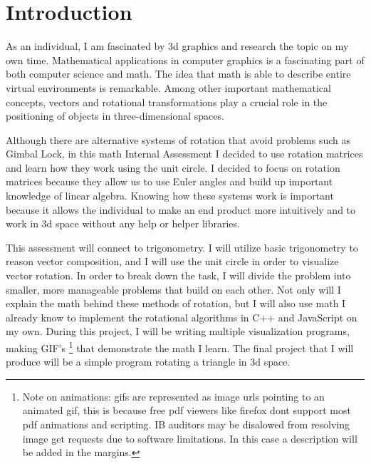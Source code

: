 \tableofcontents %

\thispagestyle{empty} %

\section*{Introduction}


\hspace{\parindent}%
As an individual, I am fascinated by 3d graphics and research the topic on my own time. Mathematical applications in computer graphics is a fascinating part of both computer science and math. The idea that math is able to describe entire virtual environments is remarkable. Among other important mathematical concepts, vectors and rotational transformations play a crucial role in the positioning of objects in three-dimensional spaces.

Although there are alternative systems of rotation that avoid problems such as Gimbal Lock, in this math Internal Assessment I decided to use rotation matrices and learn how they work using the unit circle. I decided to focus on rotation matrices because they allow us to use Euler angles and build up important knowledge of linear algebra. Knowing how these systems work is important because it allows the individual to make an end product more intuitively and to work in 3d space without any help or helper libraries.

This assessment will connect to trigonometry. I will utilize basic trigonometry to reason vector composition, and I will use the unit circle in order to visualize vector rotation. In order to break down the task, I will divide the problem into smaller, more manageable problems that build on each other. Not only will I explain the math behind these methods of rotation, but I will also use math I already know to implement the rotational algorithms in C++ and JavaScript on my own. During this project, I will be writing multiple visualization programs, making GIF's 
\footnote{Note on animations: gifs are represented as image urls pointing to an animated gif, this is because free pdf viewers like firefox dont support most pdf animations and scripting. IB auditors may be disalowed from resolving image get requests due to software limitations. In this case a description will be added in the margins.}
 that demonstrate the math I learn.  The final project that I will produce will be a simple program rotating a triangle in 3d space.

